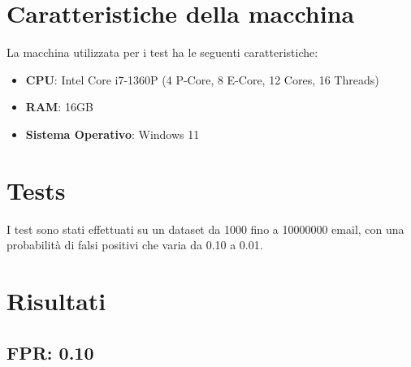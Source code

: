\documentclass[11pt]{article}
\begin{document}
    \section{Caratteristiche della macchina}\label{sec:caratteristiche-della-macchina}
    La macchina utilizzata per i test ha le seguenti caratteristiche:
    \begin{itemize}
        \item \textbf{CPU}: Intel Core i7-1360P (4 P-Core, 8 E-Core, 12 Cores, 16 Threads)
        \item \textbf{RAM}: 16GB
        \item \textbf{Sistema Operativo}: Windows 11
    \end{itemize}

    \section{Tests}\label{sec:tests}
    I test sono stati effettuati su un dataset da 1000 fino a 10000000 email, con una probabilità di falsi positivi che
    varia da 0.10 a 0.01.

    \section{Risultati}\label{sec:risultati}
    \subsection{FPR: 0.10}\label{subsec:fpr-010}
\end{document}

